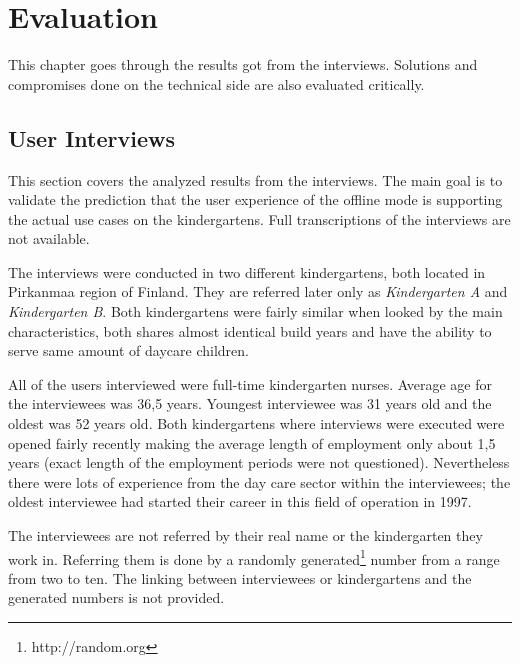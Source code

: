 \chapter{Evaluation}
\label{chap:evaluation}

This chapter goes through the results got from the interviews. Solutions and compromises done on the technical side are also evaluated critically.


\section{User Interviews}


This section covers the analyzed results from the interviews. The main goal is to validate the prediction that the user experience of the offline mode is supporting the actual use cases on the kindergartens. Full transcriptions of the interviews are not available.

The interviews were conducted in two different kindergartens, both located in Pirkanmaa region of Finland. They are referred later only as \textit{Kindergarten A} and \textit{Kindergarten B}. Both kindergartens were fairly similar when looked by the main characteristics, both shares almost identical build years and have the ability to serve same amount of daycare children.

All of the users interviewed were full-time kindergarten nurses. Average age for the interviewees was 36,5 years. Youngest interviewee was 31 years old and the oldest was 52 years old. Both kindergartens where interviews were executed were opened fairly recently making the average length of employment only about 1,5 years (exact length of the employment periods were not questioned). Nevertheless there were lots of experience from the day care sector within the interviewees; the oldest interviewee had started their career in this field of operation in 1997.

The interviewees are not referred by their real name or the kindergarten they work in. Referring them is done by a randomly generated\footnote{http://random.org} number from a range from two to ten. The linking between interviewees or kindergartens and the generated numbers is not provided.

